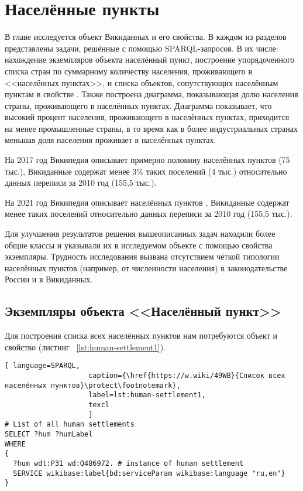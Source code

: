 \chapter{Населённые пункты}
\label{ch:human-settlement}

	В главе исследуется объект Викиданных  и его свойства. В каждом из разделов представлены задачи, решённые с помощью SPARQL-запросов. В их числе: нахождение экземпляров объекта населённый пункт, построение упорядоченного списка стран по суммарному количеству населения, проживающего в <<населённых пунктах>>, и списка объектов, сопутствующих населённым пунктам в свойстве . Также построена диаграмма, показывающая долю населения страны, проживающего в населённых пунктах. Диаграмма показывает, что высокий процент населения, проживающего в населённых пунктах, приходится на менее промышленные страны, в то время как в более индустриальных странах меньшая доля населения проживает в населённых пунктах. 

На 2017 год Википедия описывает примерно половину населённых пунктов (75 тыс.), Викиданные содержат менее 3\% таких поселений (4 тыс.) относительно данных переписи за 2010 год (155,5 тыс.). 

На 2021 год Википедия описывает населённых пунктов , Викиданные содержат менее  таких поселений относительно данных переписи за 2010 год (155,5 тыс.). 

Для улучшения результатов решения вышеописанных задач находили более общие классы и указывали их в исследуемом объекте с помощью свойства экземпляры. Трудность исследования вызвана отсутствием чёткой типологии населённых пунктов (например, от численности населения) в законодательстве России и в Викиданных.


\section{Экземпляры объекта <<Населённый пункт>>}

Для построения списка всех населённых пунктов нам потребуются объект  и свойство  (листинг ~\protect\ref{lst:human-settlement1}).

\begin{lstlisting}[ language=SPARQL, 
                    caption={\href{https://w.wiki/49WB}{Список всех населённых пунктов}\protect\footnotemark},
                    label=lst:human-settlement1,
                    texcl 
                    ]
# List of all human settlements
SELECT ?hum ?humLabel 
WHERE 
{
  ?hum wdt:P31 wd:Q486972. # instance of human settlement  
  SERVICE wikibase:label{bd:serviceParam wikibase:language "ru,en"}
}
\end{lstlisting}%

